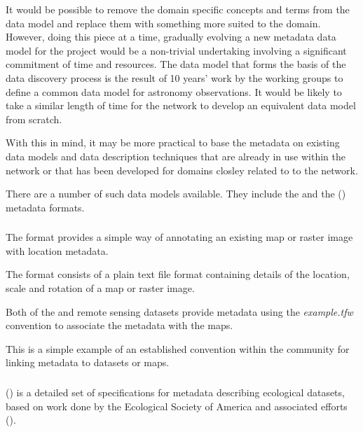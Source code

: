 \documentclass{article}
\begin{document}
It would be possible to remove the domain specific concepts and terms from
the \cite{ivoa} data model and replace them with something more suited to
the \cite{atrop} domain.
However, doing this piece at a time, gradually evolving a new metadata
data model for the \cite{atrop} project would be a non-trivial undertaking
involving a significant commitment of time and resources.
The \cite{ivoa} \cite{ivoa-obscore} data model that
forms the basis of the \cite{ivoa} data discovery process is the result
of 10 years' work by the \cite{ivoa} working groups to define a common data
model for astronomy observations.
It would be likely to take a similar length of time for the \cite{tropo}
network to develop an equivalent data model from scratch.

With this in mind, it may be more practical to base the \cite{atrop}
metadata on existing data models and data description techniques that are
already in use within the \cite{tropo} network or that has been developed
for domains closley related to to the \cite{tropo} network.

There are a number of such data models available. They include the
 and the  (\cite{eml}) metadata
formats.

\subsubsection{}

The  format provides a simple way of annotating
an existing map or raster image with \cite{gis} location metadata.

The \cite{format-world} format consists of a plain text file format containing
details of the location, scale and rotation of a map or raster image.

Both of the \cite{saatchi-2011} and \cite{baccini-2012} remote sensing
datasets provide \cite{format-world} metadata using the \textit{example.tfw}
convention to associate the metadata with the \cite{format-geotiff} maps.

This is a simple example of an established convention within the \cite{gis}
community for linking \cite{gis} metadata to datasets or maps.

\subsubsection{}

 (\cite{eml}) is a detailed set of specifications for metadata
describing ecological datasets, based on work done by the Ecological
Society of America and associated efforts 
(\cite{michener-1997}).
\end{document}
